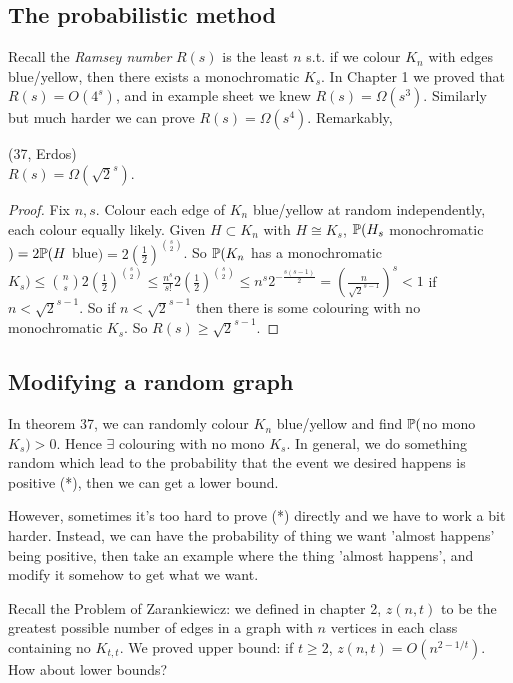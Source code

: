 \documentclass[a4paper]{article}
\begin{document}
\subsection{The probabilistic method}
Recall the \emph{Ramsey number} $R(s)$ is the least $n$ s.t. if we colour $K_n$ with edges blue/yellow, then there exists a monochromatic $K_s$. In Chapter 1 we proved that $R(s) = O(4^s)$, and in example sheet we knew $R(s) = \Omega(s^3)$. Similarly but much harder we can prove $R(s) = \Omega(s^4)$. Remarkably,

\begin{thm} (37, Erdos)\\
$R(s) = \Omega(\sqrt{2}^s)$.
\begin{proof}
Fix $n,s$. Colour each edge of $K_n$ blue/yellow at random independently, each colour equally likely. Given $H \subset K_n$ with $H \cong K_s$, $\P(H_s$ monochromatic$) = 2\P( H$ blue$) = 2(\frac{1}{2})^{s \choose 2}$. So $\P(K_n$ has a monochromatic $K_s) \leq {n \choose s} 2 (\frac{1}{2})^{s \choose 2} \leq \frac{n^s}{s!} 2 (\frac{1}{2})^{s \choose 2} \leq n^s 2^{-\frac{s(s-1)}{2}} = (\frac{n}{\sqrt{2}^{s-1}})^s < 1$ if $n < \sqrt{2}^{s-1}$. So if $n < \sqrt{2}^{s-1}$ then there is some colouring with no monochromatic $K_s$. So $R(s) \geq \sqrt{2}^{s-1}$.
\end{proof}
\end{thm}

\subsection{Modifying a random graph}
In theorem 37, we can randomly colour $K_n$ blue/yellow and find $\P($no mono $K_s)>0$. Hence $\exists$ colouring with no mono $K_s$. In general, we do something random which lead to the probability that the event we desired happens is positive (*), then we can get a lower bound.

However, sometimes it's too hard to prove (*) directly and we have to work a bit harder. Instead, we can have the probability of thing we want 'almost happens' being positive, then take an example where the thing 'almost happens', and modify it somehow to get what we want.

Recall the Problem of Zarankiewicz: we defined in chapter 2, $z(n,t)$ to be the greatest possible number of edges in a graph with $n$ vertices in each class containing no $K_{t,t}$. We proved upper bound: if $t \geq 2$, $z(n,t) = O(n^{2-1/t})$. How about lower bounds?
\end{document}
